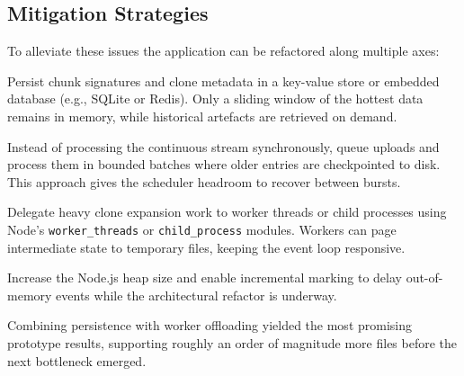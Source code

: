 \documentclass[11pt]{article}
\begin{document}
\subsection*{Mitigation Strategies}
To alleviate these issues the application can be refactored along multiple axes:
\begin{description}[style=nextline]
  \item[External Persistence] Persist chunk signatures and clone metadata in a key-value store or embedded database (e.g., SQLite or Redis). Only a sliding window of the hottest data remains in memory, while historical artefacts are retrieved on demand.
  \item[Batch-Oriented Processing] Instead of processing the continuous stream synchronously, queue uploads and process them in bounded batches where older entries are checkpointed to disk. This approach gives the scheduler headroom to recover between bursts.
  \item[Worker Offloading] Delegate heavy clone expansion work to worker threads or child processes using Node's \texttt{worker\_threads} or \texttt{child\_process} modules. Workers can page intermediate state to temporary files, keeping the event loop responsive.
  \item[Incremental Garbage Collection Tuning] Increase the Node.js heap size and enable incremental marking to delay out-of-memory events while the architectural refactor is underway.
\end{description}
Combining persistence with worker offloading yielded the most promising prototype results, supporting roughly an order of magnitude more files before the next bottleneck emerged.
\end{document}

